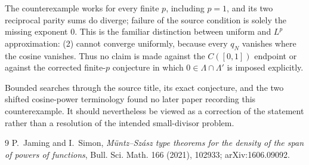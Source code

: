 \documentclass[10pt]{article}
\begin{document}
The counterexample works for every finite $p$, including $p=1$, and its two
reciprocal parity sums do diverge; failure of the source condition is solely
the missing exponent $0$. This is the familiar distinction between uniform
and $L^p$ approximation: (2) cannot converge uniformly, because every $q_N$
vanishes where the cosine vanishes. Thus no claim is made against the
$C([0,1])$ endpoint or against the corrected finite-$p$ conjecture in which
$0\in\Lambda\cap\Lambda'$ is imposed explicitly.

Bounded searches through the source title, its exact conjecture, and the two
shifted cosine-power terminology found no later paper recording this
counterexample. It should nevertheless be viewed as a correction of the
statement rather than a resolution of the intended small-divisor problem.

{\small
\begin{thebibliography}{9}
P.~Jaming and I.~Simon,
\emph{M\"untz--Sz\'asz type theorems for the density of the span of powers of
functions}, Bull. Sci. Math. 166 (2021), 102933; arXiv:1606.09092.
\end{thebibliography}
}
\end{document}
